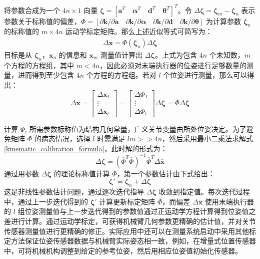 \documentclass[cn,11pt,chinese,blue,bibstyle=ieeetr]{elegantbook}
\begin{document}
将参数合成为一个 $4n \times 1$ 向量 $\bm{\zeta} = {\left[ \bm{a}^T \quad \bm{\alpha}^T \quad \bm{d}^T \quad \bm{\theta}^T \right]}^T$。令 $\Delta\bm{\zeta} = \bm{\zeta}_m - \bm{\zeta}_n$ 表示参数关于标称值的偏差，$\bm{\varPhi} = \left[{\partial\bm{k}}/{\partial\bm{a}} \quad {\partial\bm{k}}/{\partial\bm{\alpha}} \quad {\partial\bm{k}}/{\partial\bm{d}} \quad {\partial\bm{k}}/{\partial\bm{\theta}}\right]$ 为计算参数 $\bm{\zeta}_n$ 的标称值的 $m \times 4n$ 运动学标定矩阵。那么上述近似等式可简写为：
\begin{equation}
	\begin{aligned}
		\Delta\bm{x} = \bm{\varPhi}\left(\bm{\zeta}_n\right)\Delta\bm{\zeta}
	\end{aligned}
\end{equation}
目标是从 $\bm{\zeta}_n$，$\bm{x}_n$ 的信息和 $\bm{x}_m$ 测量值计算出 $\Delta\bm{\zeta}$。上式为包含 $4n$ 个未知数，$m$ 个方程的方程组，其中 $m<4n$，因此必须对末端执行器的位姿进行足够数量的测量，进而得到至少包含 $4n$ 个方程的方程组。若对 $l$ 个位姿进行测量，那么可以得出：
\begin{equation}\label{kinematic_calibration_formula}
\Delta\bar{\bm{x}} = \begin{bmatrix} \Delta\bm{x}_1 \\ \vdots \\ \Delta\bm{x}_l \end{bmatrix} = \begin{bmatrix} \Delta\bm{\varPhi}_1 \\ \vdots \\ \Delta\bm{\varPhi}_l \end{bmatrix} \Delta\bm{\zeta} = \bar{\bm{\varPhi}}\Delta\bm{\zeta}
\end{equation}

计算 $\bm{\varPhi}_i$ 所需参数标称值为结构几何常量，广义关节变量由所处位姿决定。为了避免矩阵 $\bar{\bm{\varPhi}}$ 的病态情况，选择 $l$ 时需满足 $lm >> 4n$，然后采用最小二乘法求解式 \ref{kinematic_calibration_formula}，此时解的形式为：
\begin{equation}
	\Delta\bm{\zeta} = (\bar{\bm{\varPhi}}^T\bar{\bm{\varPhi}})^{-1}\bar{\bm{\varPhi}}^T\Delta\bar{\bm{x}}
\end{equation}
通过用参数 $\Delta\bm{\zeta}$ 的理论标称值计算 $\bar{\bm{\varPhi}}$，第一个参数估计由下式给出：
\begin{equation}
\bm{\zeta}'=\bm{\zeta}_n + \Delta\bm{\zeta}
\end{equation}
这是非线性参数估计问题，通过逐次迭代指导 $\Delta\bm{\zeta}$ 收敛到指定值。每次迭代过程中，通过上一步迭代得到的 $\bm{\zeta}'$ 计算更新标定矩阵 $\bar{\bm{\varPhi}}$，而偏差 $\Delta\bar{\bm{x}}$ 使用末端执行器的 $l$ 组位姿测量值与上一步迭代得到的参数值通过正运动学方程计算得到位姿值之差进行计算。通过运动学标定，可获得机械臂几何参数更精确的估计值，并对关节传感器测量值进行更精确的修正。实际应用中还可以在测量系统启动中采用其他标定方法保证位姿传感器数据与机械臂实际姿态相一致，例如，在增量式位置传感器中，可将机械机构调整到给定的参考位姿，然后用相应位姿值初始化传感器。
\end{document}
